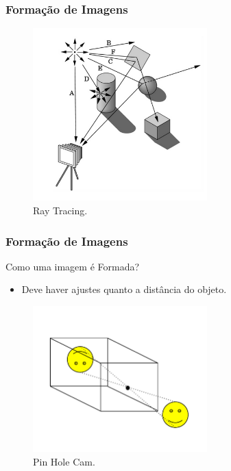 \documentclass{beamer}
\begin{document}
\begin{frame}
\frametitle{Formação de Imagens}

	\begin{figure}[htb!]
  		\centering
      		\includegraphics[width=0.6\textwidth]{Figures/raytracing}
      		\caption{Ray Tracing.}
  		\label{iep}
	\end{figure}


\end{frame}

\begin{frame}
\frametitle{Formação de Imagens}

	\begin{block}{Como uma imagem é Formada?}
		\begin{itemize}
			\item Deve haver ajustes quanto a distância do objeto.
		\end{itemize}
	\end{block}
	\begin{figure}[htb!]
  		\centering
      		\includegraphics[width=0.6\textwidth]{Figures/pinHoleCam}
      		\caption{Pin Hole Cam.}
  		\label{iep}
	\end{figure}


\end{frame}
\end{document}
